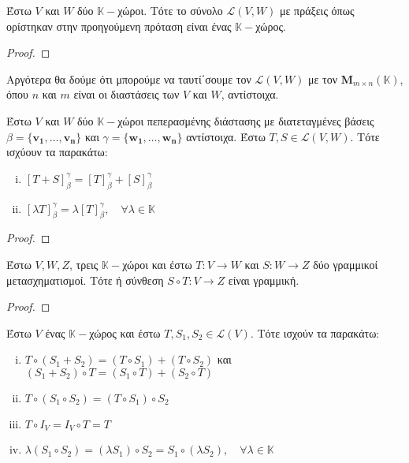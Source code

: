 \begin{thm}
  Έστω $V$ και $W$ δύο $ \mathbb{K}- $χώροι. Τότε το σύνολο $ \mathcal{L}(V,W) $ 
  με πράξεις όπως ορίστηκαν στην προηγούμενη πρόταση είναι ένας $ \mathbb{K}- $χώρος.
\end{thm}

\begin{proof}
\end{proof}

Αργότερα θα δούμε ότι μπορούμε να ταυτί΄σουμε τον $ \mathcal{L}(V,W) $ με τον $
\textbf{M}_{m \times n}(\mathbb{K}) $, όπου $n$ και $m$ είναι οι διαστάσεις των 
$V$ και $W$, αντίστοιχα. 

\begin{thm}
  Έστω $V$ και $W$ δύο $ \mathbb{K}- $χώροι πεπερασμένης διάστασης με διατεταγμένες 
  βάσεις $ \beta = \{ \mathbf{v_{1}}, \ldots, \mathbf{v_{n}} \} $ και $ \gamma = 
  \{ \mathbf{w_{1}}, \ldots, \mathbf{w_{n}} \} $ αντίστοιχα. Έστω $ T,S \in
  \mathcal{L}(V,W) $. Τότε ισχύουν τα παρακάτω:
  \begin{enumerate}[i)]
    \item $ [T+S]_{\beta}^{\gamma} = [T]_{\beta}^{\gamma} + [S]_{\beta}^{\gamma}$
    \item $ [\lambda T]_{\beta}^{\gamma} = \lambda [T]_{\beta}^{\gamma}, \quad \forall
      \lambda \in \mathbb{K} $
  \end{enumerate}
\end{thm}

\begin{proof}
\end{proof}


\begin{thm}
  Έστω $ V,W,Z $, τρεις $ \mathbb{K}- $χώροι και έστω $ T \colon V \to W $ και $ S
  \colon W \to Z $ δύο γραμμικοί μετασχηματισμοί. Τότε ή σύνθεση 
  $ S \circ T \colon V \to Z $ είναι γραμμική.
\end{thm}

\begin{proof}
\end{proof}

\begin{thm}
  Έστω $V$ ένας $ \mathbb{K}- $χώρος και έστω $ T, S_{1}, S_{2} \in \mathcal{L}(V) $. 
  Τότε ισχούν τα παρακάτω:
  \begin{enumerate}[i)]
    \item $ T \circ (S_{1}+S_{2}) = (T \circ S_{1}) + (T \circ S_{2}) $ \quad και \quad $
      (S_{1}+S_{2}) \circ T = (S_{1} \circ T) + (S_{2} \circ T) $
    \item $ T \circ (S_{1} \circ S_{2}) = (T \circ S_{1}) \circ S_{2} $
    \item $ T \circ I_{V} = I_{V} \circ T = T $
    \item $ \lambda (S_{1} \circ S_{2}) = (\lambda S_{1}) \circ S_{2} = S_{1} \circ
      (\lambda S_{2}), \quad \forall \lambda \in \mathbb{K} $
  \end{enumerate}
\end{thm}


